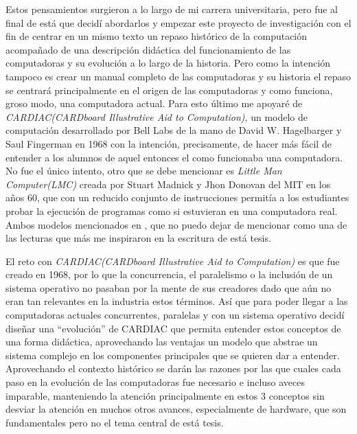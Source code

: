 \documentclass[letterpaper,12pt,oneside]{book}
\begin{document}
	Estos pensamientos surgieron a lo largo de mi carrera universitaria, pero fue al final de está que decidí abordarlos y empezar este proyecto de investigación
	con el fin de centrar en un mismo texto un repaso histórico de la computación acompañado de una descripción didáctica del funcionamiento de las computadoras
	y su evolución a lo largo de la historia. Pero como la intención tampoco es crear un manual completo de las computadoras y su historia el repaso
	se centrará principalmente en el origen de las computadoras y como funciona, groso modo, una computadora actual. Para esto último me apoyaré
	de \textit{CARDIAC(CARDboard Illustrative Aid to Computation)}, un modelo de computación 
	desarrollado por Bell Labs de la mano de David W. Hagelbarger y Saul Fingerman en 1968\cite{david_hegelbarger_instruction_1968} con la intención, precisamente,
	de hacer más fácil de entender a los alumnos de aquel entonces el como funcionaba una computadora. No fue el único intento, otro que se debe mencionar es
	\textit{Little Man Computer(LMC)} creada por Stuart Madnick y Jhon Donovan del MIT en los años 60, que con un reducido conjunto de instrucciones permitía a los estudiantes 
	probar la ejecución de programas como si estuvieran en una computadora real. Ambos modelos mencionados en \cite{mark_jones_lorenzo_paper_2017}, que
	no puedo dejar de mencionar como una de las lecturas que más me inspiraron en la escritura de está tesis.
	
	El reto con \textit{CARDIAC(CARDboard Illustrative Aid to Computation)} es que fue creado en 1968, por lo que la concurrencia, el paralelismo o
	la inclusión de un sistema operativo no pasaban por la mente de sus creadores dado que aún no eran tan relevantes en la industria estos términos. Así que
	para poder llegar a las computadoras actuales concurrentes, paralelas y con un sistema operativo decidí diseñar una ``evolución'' de CARDIAC que permita
	entender estos conceptos de una forma didáctica, aprovechando las ventajas un modelo que abstrae un sistema complejo en los componentes principales
	que se quieren dar a entender. Aprovechando el contexto histórico se darán las razones por las que cuales cada paso en la evolución de las
	computadoras fue necesario e incluso aveces imparable, manteniendo la atención principalmente en estos 3 conceptos sin desviar la atención en
	muchos otros avances, especialmente de hardware, que son fundamentales pero no el tema central de está tesis.
	 
\end{document}

